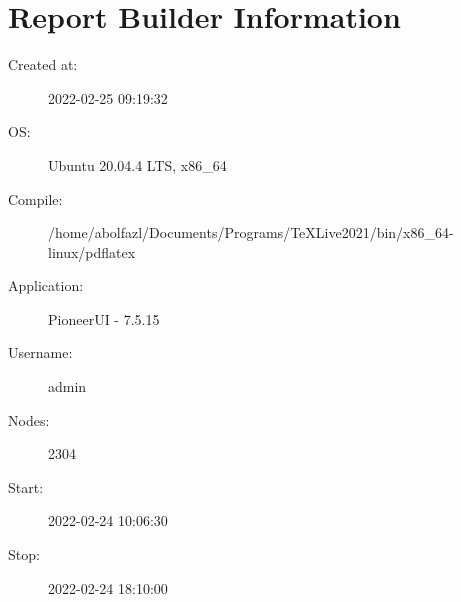 \clearpage\section{Report Builder Information}\begin{description}
\item[Created at:] 2022-02-25 09:19:32
\item[OS:] Ubuntu 20.04.4 LTS, x86\_64
\item[Compile:] /home/abolfazl/Documents/Programs/TeXLive2021/bin/x86\_64-linux/pdflatex
\item[Application:] PioneerUI - 7.5.15
\item[Username:] admin
\item[Nodes:] 2304
\item[Start:] 2022-02-24 10:06:30
\item[Stop:]  2022-02-24 18:10:00
\end{description}